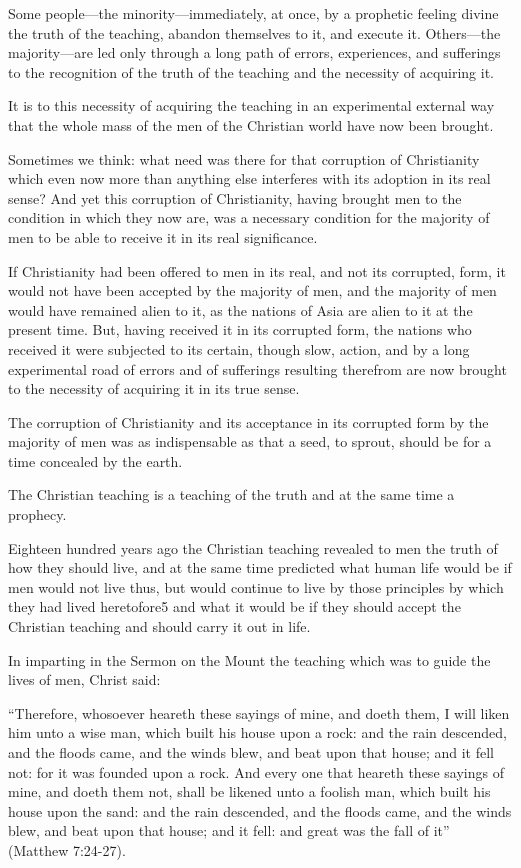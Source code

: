\documentclass{book}
\begin{document}
Some people—the minority—immediately, at once, by a prophetic feeling divine the truth of the teaching, abandon themselves to it, and execute it. Others—the majority—are led only through a long path of errors, experiences, and sufferings to the recognition of the truth of the teaching and the necessity of acquiring it.

It is to this necessity of acquiring the teaching in an experimental external way that the whole mass of the men of the Christian world have now been brought.

Sometimes we think: what need was there for that corruption of Christianity which even now more than anything else interferes with its adoption in its real sense? And yet this corruption of Christianity, having brought men to the condition in which they now are, was a necessary condition for the majority of men to be able to receive it in its real significance.

If Christianity had been offered to men in its real, and not its corrupted, form, it would not have been accepted by the majority of men, and the majority of men would have remained alien to it, as the nations of Asia are alien to it at the present time. But, having received it in its corrupted form, the nations who received it were subjected to its certain, though slow, action, and by a long experimental road of errors and of sufferings resulting therefrom are now brought to the necessity of acquiring it in its true sense.

The corruption of Christianity and its acceptance in its corrupted form by the majority of men was as indispensable as that a seed, to sprout, should be for a time concealed by the earth.

The Christian teaching is a teaching of the truth and at the same time a prophecy.

Eighteen hundred years ago the Christian teaching revealed to men the truth of how they should live, and at the same time predicted what human life would be if men would not live thus, but would continue to live by those principles by which they had lived heretofore5 and what it would be if they should accept the Christian teaching and should carry it out in life.

In imparting in the Sermon on the Mount the teaching which was to guide the lives of men, Christ said:

“Therefore, whosoever heareth these sayings of mine, and doeth them, I will liken him unto a wise man, which built his house upon a rock: and the rain descended, and the floods came, and the winds blew, and beat upon that house; and it fell not: for it was founded upon a rock. And every one that heareth these sayings of mine, and doeth them not, shall be likened unto a foolish man, which built his house upon the sand: and the rain descended, and the floods came, and the winds blew, and beat upon that house; and it fell: and great was the fall of it” (Matthew 7:24-27).
\end{document}
